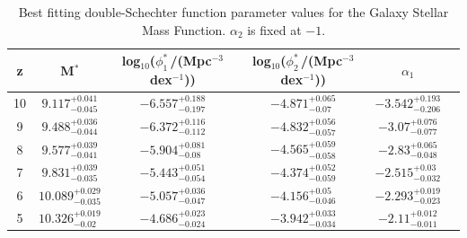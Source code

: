 \begin{table}
	\centering
	\begin{tabular}[t]{cccccc}
		\hline
		z &  M$^{*}$ & log$_{10}$($\phi^{*}_{1}$\,/(Mpc$^{-3}$ dex$^{-1}$)) & log$_{10}$($\phi^{*}_{2}$\,/(Mpc$^{-3}$ dex$^{-1}$)) & $\alpha_1$ \\
		\hline
		10 &            $9.117_{ - 0.045 }^{ +0.041 }$ &            $-6.557_{-0.197}^{+0.188 }$ &            $-4.871_{-0.07}^{+0.065 }$ &            $-3.542_{-0.206}^{+0.193}$ \\
		9 &            $9.488_{ - 0.044 }^{ +0.036 }$ &            $-6.372_{-0.112}^{+0.116 }$ &            $-4.832_{-0.057}^{+0.056 }$ &            $-3.07_{-0.077}^{+0.076}$ \\
		8 &            $9.577_{ - 0.041 }^{ +0.039 }$ &            $-5.904_{-0.08}^{+0.081 }$ &            $-4.565_{-0.058}^{+0.059 }$ &            $-2.83_{-0.048}^{+0.065}$ \\
		7 &            $9.831_{ - 0.035 }^{ +0.039 }$ &            $-5.443_{-0.054}^{+0.051 }$ &            $-4.374_{-0.059}^{+0.052 }$ &            $-2.515_{-0.032}^{+0.03}$ \\
		6 &            $10.089_{ - 0.035 }^{ +0.029 }$ &            $-5.057_{-0.047}^{+0.036 }$ &            $-4.156_{-0.046}^{+0.05 }$ &            $-2.293_{-0.023}^{+0.019}$ \\
		5 &            $10.326_{ - 0.02 }^{ +0.019 }$ &            $-4.686_{-0.024}^{+0.023 }$ &            $-3.942_{-0.034}^{+0.033 }$ &            $-2.11_{-0.011}^{+0.012}$ \\
		\hline
	\end{tabular}
	\caption{Best fitting double-Schechter function parameter values for the Galaxy Stellar Mass Function. $\alpha_{2}$ is fixed at $-1$.} \label{tab:schechter_params}
\end{table}

